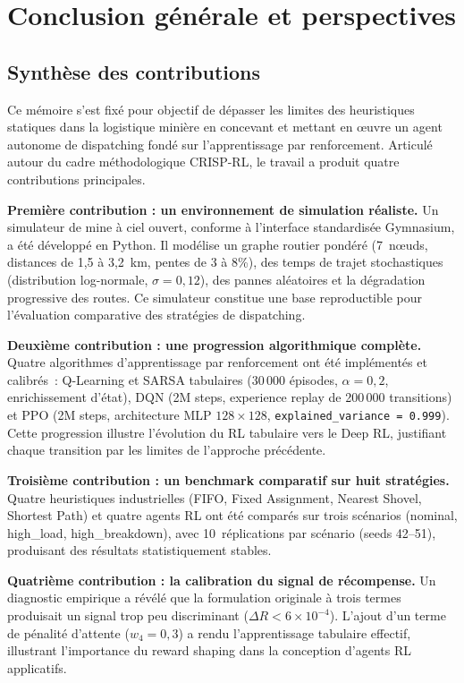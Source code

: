 \documentclass[11pt,a4paper]{report}
\begin{document}
\chapter*{Conclusion générale et perspectives}

\section*{Synthèse des contributions}

Ce mémoire s'est fixé pour objectif de dépasser les limites des heuristiques statiques dans la logistique minière en concevant et mettant en œuvre un agent autonome de dispatching fondé sur l'apprentissage par renforcement. Articulé autour du cadre méthodologique CRISP-RL, le travail a produit quatre contributions principales.

\textbf{Première contribution : un environnement de simulation réaliste.} Un simulateur de mine à ciel ouvert, conforme à l'interface standardisée Gymnasium, a été développé en Python. Il modélise un graphe routier pondéré (7~nœuds, distances de 1,5 à 3,2~km, pentes de 3 à 8\%), des temps de trajet stochastiques (distribution log-normale, $\sigma = 0{,}12$), des pannes aléatoires et la dégradation progressive des routes. Ce simulateur constitue une base reproductible pour l'évaluation comparative des stratégies de dispatching.

\textbf{Deuxième contribution : une progression algorithmique complète.} Quatre algorithmes d'apprentissage par renforcement ont été implémentés et calibrés~: Q-Learning et SARSA tabulaires (30\,000 épisodes, $\alpha = 0{,}2$, enrichissement d'état), DQN (2M steps, experience replay de 200\,000 transitions) et PPO (2M steps, architecture MLP $128 \times 128$, \texttt{explained\_variance = 0.999}). Cette progression illustre l'évolution du RL tabulaire vers le Deep RL, justifiant chaque transition par les limites de l'approche précédente.

\textbf{Troisième contribution : un benchmark comparatif sur huit stratégies.} Quatre heuristiques industrielles (FIFO, Fixed Assignment, Nearest Shovel, Shortest Path) et quatre agents RL ont été comparés sur trois scénarios (nominal, high\_load, high\_breakdown), avec 10~réplications par scénario (seeds 42--51), produisant des résultats statistiquement stables.

\textbf{Quatrième contribution : la calibration du signal de récompense.} Un diagnostic empirique a révélé que la formulation originale à trois termes produisait un signal trop peu discriminant ($\Delta R < 6 \times 10^{-4}$). L'ajout d'un terme de pénalité d'attente ($w_4 = 0{,}3$) a rendu l'apprentissage tabulaire effectif, illustrant l'importance du reward shaping dans la conception d'agents RL applicatifs.
\end{document}
